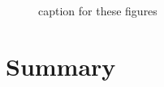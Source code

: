 \begin{minipage}[t]{.37 \textwidth}
    \begin{figure}[H]
        \caption{caption for these figures}
    \end{figure}
\end{minipage}


\section{Summary}
